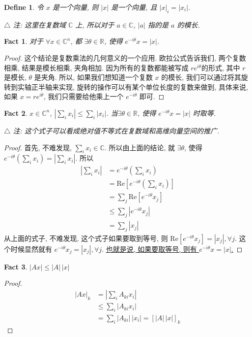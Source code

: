 \documentclass{article}
\newtheorem{define}{Define}
\newtheorem{fact}{Fact}
\begin{document}
\begin{define}
  令 $x$ 是一个向量, 则 $|x|$ 是一个向量, 且 $|x|_i = |x_i|$.

  $\triangle$ 注: 这里在复数域 $\mathbb{C}$ 上, 所以对于 $a\in\mathbb{C}$, $|a|$ 指的是 $a$ 的模长.
\end{define}

\begin{fact}
  对于 $\forall x\in \mathbb{C}^n$, 都 $\exists \theta \in \mathbb{R}$, 使得 $e^{-i\theta} x = |x|$.
\end{fact}
\begin{proof}
  这个结论是复数乘法的几何意义的一个应用.
  欧拉公式告诉我们, 两个复数相乘, 结果是模长相乘, 夹角相加.
  因为所有的复数都能被写成 $re^{i\theta}$的形式, 其中 $r$ 是模长, $\theta$ 是夹角.
  所以, 如果我们想知道一个复数 $x$ 的模长, 我们可以通过将其旋转到实轴正半轴来实现, 旋转的操作可以有某个单位长度的复数来做到, 具体来说, 如果 $x = re^{i\theta}$, 我们只需要给他乘上一个 $e^{-i\theta}$ 即可.
\end{proof}

\begin{fact}
  $x\in \mathbb{C}^n$, $|\sum_i x_i| \leq \sum_i |x_i|$.
  当$\exists \theta\in\mathbb{R}$, 使得 $e^{-i\theta}x = |x|$ 时取等.

  $\triangle$ 注: 这个式子可以看成绝对值不等式在复数域和高维向量空间的推广.
\end{fact}
\begin{proof}
  首先, 不难发现, $\sum_i x_i \in \mathbb{C}$.
  所以由上面的结论, 就 $\exists \theta$, 使得 $e^{-i\theta} (\sum_i x_i) = |\sum_i x_i|$.
  所以
  \begin{align*}
    |\sum_i x_i| &= e^{-i\theta}(\sum_i x_i) \\
    &= \mathrm{Re}\left[e^{-i\theta}(\sum_i x_i)\right] \\
    &= \sum_j \mathrm{Re}\left[e^{-i\theta} x_j\right]\\
    &\leq \sum_j |e^{-i\theta}x_j| \\
    &= \sum_j |x_j|
  \end{align*}
  从上面的式子, 不难发现, 这个式子如果要取到等号, 则 $\mathrm{Re}\left[e^{-i\theta}x_j\right] = |x_j|, \forall j$.
  这个时候显然就有 $e^{-i\theta}x_j = |x_j|, \forall j$.
  \underline{也就是说, 如果要取等号, 则有 $e^{-i\theta} x = |x|$.}
\end{proof}
\begin{fact}
  $|Ax| \leq |A|\,|x|$
\end{fact}
\begin{proof}
  \begin{align*}
    |Ax|_k &= |\sum_i A_{ki}x_i| \\
           &\leq \sum_i |A_{ki}x_i| \\
    &= \sum_i |A_{ki}|\,|x_i| = [|A|\,|x|]_k
  \end{align*}
\end{proof}
\end{document}
